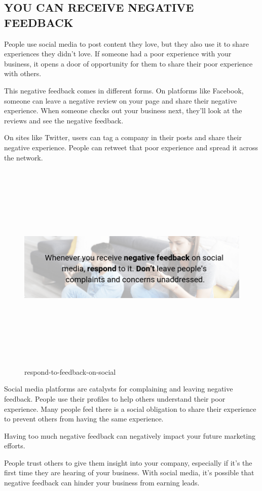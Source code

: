 \documentclass[a4paper]{article}
\begin{document}
 \subsection{ YOU CAN RECEIVE NEGATIVE FEEDBACK}
 People use social media to post content they love, but they also use it to share experiences they didn’t love. If someone had a poor experience with your business, it opens a door of opportunity for them to share their poor experience with others.

This negative feedback comes in different forms. On platforms like Facebook, someone can leave a negative review on your page and share their negative experience. When someone checks out your business next, they’ll look at the reviews and see the negative feedback.

On sites like Twitter, users can tag a company in their posts and share their negative experience. People can retweet that poor experience and spread it across the network.
 \begin{figure}
 \centering
 \includegraphics[width=5in,height=4in]{asb}
 \caption{respond-to-feedback-on-social}
 \end{figure}
 Social media platforms are catalysts for complaining and leaving negative feedback. People use their profiles to help others understand their poor experience. Many people feel there is a social obligation to share their experience to prevent others from having the same experience.

Having too much negative feedback can negatively impact your future marketing efforts.

People trust others to give them insight into your company, especially if it’s the first time they are hearing of your business. With social media, it’s possible that negative feedback can hinder your business from earning leads.
\end{document}
